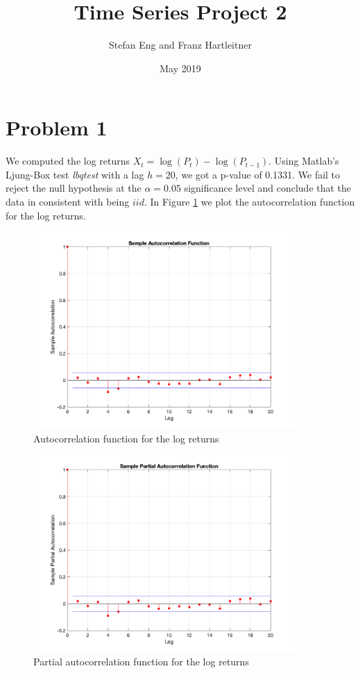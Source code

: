 \documentclass{article}
\title{Time Series Project 2}
\author{Stefan Eng and Franz Hartleitner}
\date{May 2019}
\begin{document}
\maketitle

\section*{Problem 1}

We computed the log returns $X_t = \log(P_t) - \log(P_{t - 1})$.
Using Matlab's Ljung-Box test \textit{lbqtest} with a lag $h = 20$, we got a p-value of 0.1331.
We fail to reject the null hypothesis at the $\alpha = 0.05$ significance level and conclude that the data in consistent with being $iid$.
In Figure \ref{fig:acf_log_rtns} we plot the autocorrelation function for the log returns.


\begin{figure}[H]
\includegraphics[width=10cm]{plots/acf_log_rtns.png}
\centering
\caption{Autocorrelation function for the log returns}
\label{fig:acf_log_rtns}
\end{figure}

\begin{figure}[H]
\includegraphics[width=10cm]{plots/pacf_log_rtns.png}
\centering
\caption{Partial autocorrelation function for the log returns}
\label{fig:pacf_log_rtns}
\end{figure}
\end{document}
